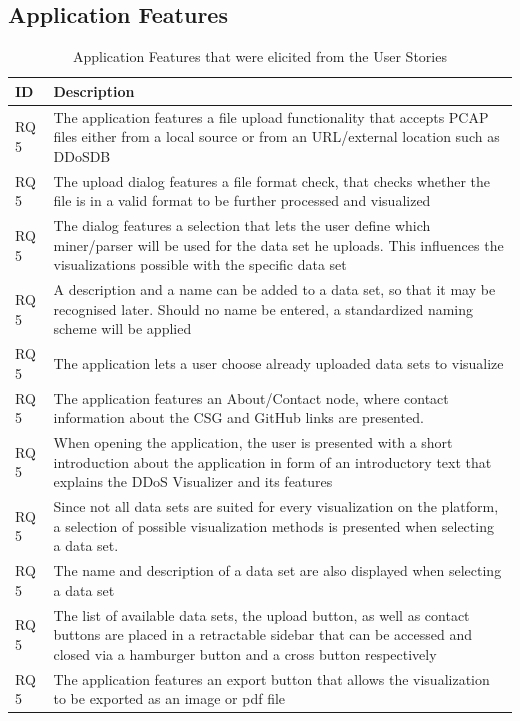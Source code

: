 \subsection{Application Features}
\begin{table}[]
\centering
\begin{tabular}{|p{1.1cm}|p{12cm}|}
\hline
\textbf{ID} & \textbf{Description} \\ \hline
RQ 5 & The application features a file upload functionality that accepts PCAP files either from a local source or from an URL/external location such as DDoSDB\\ \hline
RQ 5 & The upload dialog features a file format check, that checks whether the file is in a valid format to be further processed and visualized\\ \hline
RQ 5 & The dialog features a selection that lets the user define which miner/parser will be used for the data set he uploads. This influences the visualizations possible with the specific data set\\ \hline
RQ 5 & A description and a name can be added to a data set, so that it may be recognised later. Should no name be entered, a standardized naming scheme will be applied\\ \hline
RQ 5 & The application lets a user choose already uploaded data sets to visualize\\ \hline
RQ 5 & The application features an About/Contact node, where contact information about the CSG and GitHub links are presented.\\ \hline
RQ 5 & When opening the application, the user is presented with a short introduction about the application in form of an introductory text that explains the DDoS Visualizer and its features\\ \hline
RQ 5 & Since not all data sets are suited for every visualization on the platform, a selection of possible visualization methods is presented when selecting a data set. \\ \hline
RQ 5 & The name and description of a data set are also displayed when selecting a data set\\ \hline
RQ 5 & The list of available data sets, the upload button, as well as contact buttons are placed in a retractable sidebar that can be accessed and closed via a hamburger button and a cross button respectively\\ \hline
RQ 5 & The application features an export button that allows the visualization to be exported as an image or pdf file\\ \hline

\end{tabular}
\caption{Application Features that were elicited from the User Stories}
\label{table:3}
\end{table}

